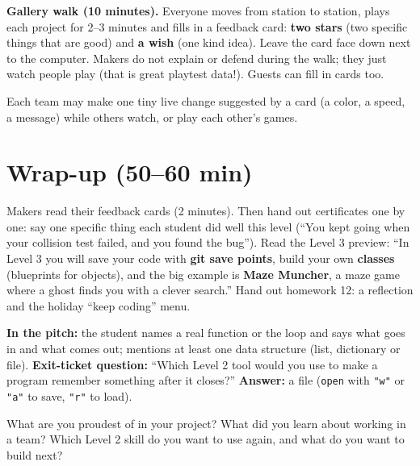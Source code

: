 \textbf{Gallery walk (10 minutes).} Everyone moves from station to station, plays each project for
2--3 minutes and fills in a feedback card: \textbf{two stars} (two specific things that are good) and
\textbf{a wish} (one kind idea). Leave the card face down next to the computer. Makers do not explain or
defend during the walk; they just watch people play (that is great playtest data!). Guests can fill in
cards too.

\begin{freebuild}
Each team may make one tiny live change suggested by a card (a color, a speed, a message) while
others watch, or play each other's games.
\end{freebuild}

\section{Wrap-up (50--60 min)}
Makers read their feedback cards (2 minutes). Then hand out certificates one by one: say one specific
thing each student did well this level (\enquote{You kept going when your collision test failed, and
you found the bug}). Read the Level 3 preview: \enquote{In Level 3 you will save your code with
\textbf{git save points}, build your own \textbf{classes} (blueprints for objects), and the big example
is \textbf{Maze Muncher}, a maze game where a ghost finds you with a clever search.} Hand out homework 12:
a reflection and the holiday \enquote{keep coding} menu.

\begin{formativecheck}
\textbf{In the pitch:} the student names a real function or the loop and says what goes in and what
comes out; mentions at least one data structure (list, dictionary or file).
\textbf{Exit-ticket question:} \enquote{Which Level 2 tool would you use to make a program remember
something after it closes?}
\textbf{Answer:} a file (\texttt{open} with \texttt{"w"} or \texttt{"a"} to save, \texttt{"r"} to load).
\end{formativecheck}

\begin{reflection}
What are you proudest of in your project? What did you learn about working in a team? Which
Level 2 skill do you want to use again, and what do you want to build next?
\end{reflection}

